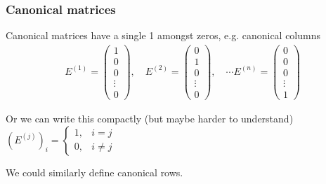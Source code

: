 \documentclass[usenames,dvipsnames,aspectratio=169,10pt]{beamer}
\numberwithin{equation}{section}
\begin{document}
\begin{frame}
\frametitle{Canonical matrices}

Canonical matrices have a single 1 amongst zeros, e.g. canonical columns
\begin{align*}
E^{(1)} =
\begin{pmatrix}
 1 \\
 0 \\
 0 \\
 \vdots \\
 0
\end{pmatrix}
, \quad
E^{(2)} =
\begin{pmatrix}
 0 \\
 1 \\
 0 \\
 \vdots \\
 0
\end{pmatrix}
, \quad \cdots
E^{(n)} =
\begin{pmatrix}
 0 \\
 0 \\
 0 \\
 \vdots \\
 1
\end{pmatrix}
\end{align*}

Or we can write this compactly (but maybe harder to understand) $\left( E^{(j)} \right)_{i}= \begin{cases} 1, & i=j \\ 0, & i\neq j \end{cases}$

We could similarly define canonical rows.
\end{frame}
\end{document}
